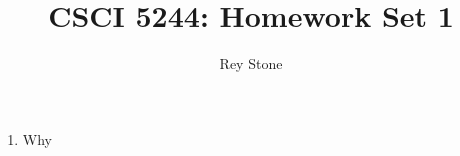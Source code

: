 \documentclass[11pt]{article}
\title{CSCI 5244: Homework Set 1}
\author{Rey Stone}
\begin{document}
\maketitle

\begin{enumerate}
  \item{Why}

\end{enumerate}
\end{document}
